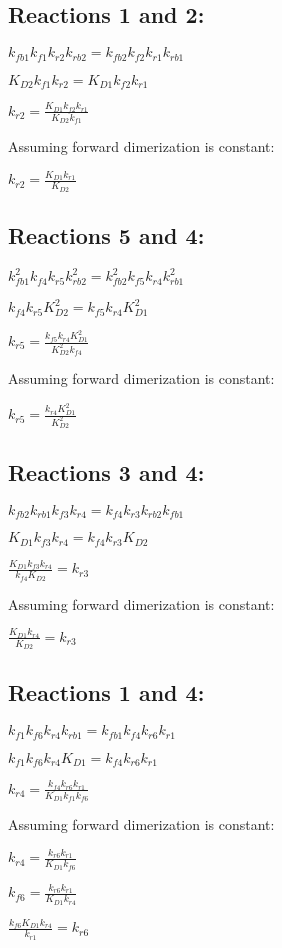 \documentclass[12pt]{article}
\begin{document}
\subsection*{Reactions 1 and 2:}

$k_{fb1} k_{f1} k_{r2} k_{rb2} = k_{fb2} k_{f2} k_{r1} k_{rb1}$

$K_{D2} k_{f1} k_{r2} = K_{D1} k_{f2} k_{r1}$

$ k_{r2} = \frac{K_{D1} k_{f2} k_{r1}}{K_{D2} k_{f1}}$

Assuming forward dimerization is constant:

$ k_{r2} = \frac{K_{D1} k_{r1}}{K_{D2}}$


\subsection*{Reactions 5 and 4:}

$k_{fb1}^2 k_{f4} k_{r5} k_{rb2}^2 = k_{fb2}^2 k_{f5} k_{r4} k_{rb1}^2$

$k_{f4} k_{r5} K_{D2}^2 = k_{f5} k_{r4} K_{D1}^2$

$k_{r5}  = \frac{k_{f5} k_{r4} K_{D1}^2}{K_{D2}^2 k_{f4}}$

Assuming forward dimerization is constant:

$k_{r5}  = \frac{k_{r4} K_{D1}^2}{K_{D2}^2}$

\subsection*{Reactions 3 and 4:}

$k_{fb2} k_{rb1} k_{f3} k_{r4} = k_{f4} k_{r3} k_{rb2} k_{fb1}$

$K_{D1} k_{f3} k_{r4} = k_{f4} k_{r3} K_{D2}$

$\frac{K_{D1} k_{f3} k_{r4}}{ k_{f4}  K_{D2} } = k_{r3} $

Assuming forward dimerization is constant:

$\frac{K_{D1} k_{r4}}{ K_{D2} } = k_{r3} $

\subsection*{Reactions 1 and 4:}

$k_{f1} k_{f6} k_{r4} k_{rb1} = k_{fb1} k_{f4} k_{r6} k_{r1}$

$k_{f1} k_{f6} k_{r4} K_{D1} = k_{f4} k_{r6} k_{r1}$

$ k_{r4} = \frac{k_{f4} k_{r6} k_{r1}}{K_{D1} k_{f1} k_{f6}}$

Assuming forward dimerization is constant:

$ k_{r4} = \frac{k_{r6} k_{r1}}{K_{D1} k_{f6}}$

$ k_{f6} = \frac{k_{r6} k_{r1}}{K_{D1} k_{r4}}$

$ \frac{k_{f6} K_{D1} k_{r4}}{k_{r1}} = k_{r6}$
\end{document}
